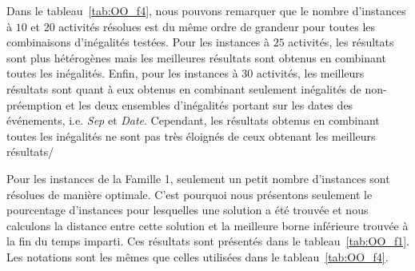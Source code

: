 Dans le tableau~\ref{tab:OO_f4}, nous pouvons remarquer que le nombre
d'instances à $10$ et $20$ activités résolues est du même ordre de
grandeur pour toutes les combinaisons d'inégalités testées. Pour les
instances à $25$ activités, les résultats sont plus hétérogènes mais
les meilleures résultats sont obtenus en combinant toutes les
inégalités. Enfin, pour les instances à $30$ activités, les meilleurs
résultats sont quant à eux obtenus en combinant seulement inégalités
de non-préemption et les deux ensembles d'inégalités portant sur les
dates des événements, i.e. {\it Sep} et {\it Date}. Cependant, les
résultats obtenus en combinant toutes les inégalités ne sont pas très
éloignés de ceux obtenant les meilleurs résultats/ 

Pour les instances de la Famille 1, seulement un petit nombre
d'instances sont résolues de manière optimale. C'est pourquoi nous
présentons seulement le pourcentage d'instances pour lesquelles une
solution a été trouvée et nous calculons la distance entre cette
solution et la meilleure borne inférieure trouvée à la fin du temps
imparti. Ces résultats sont présentés dans le
tableau~\ref{tab:OO_f1}. Les notations sont les mêmes que celles
utilisées dans le tableau~\ref{tab:OO_f4}.

